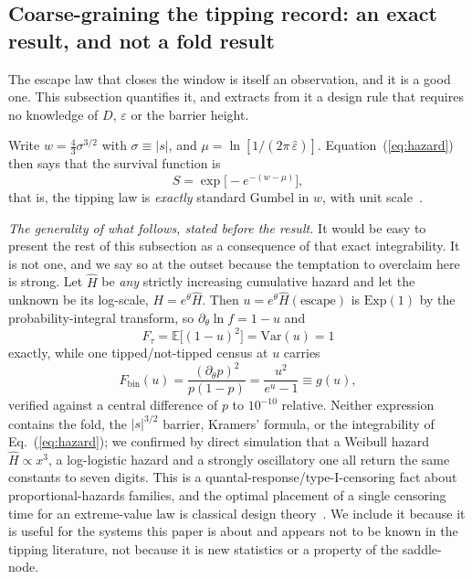 \documentclass[%
 twocolumn,
 superscriptaddress,
 amsmath,amssymb,
 aps,
 pre,
 floatfix,
]{revtex4-2}
\newcommand{\Sig}{\hat\varepsilon}
\begin{document}
\subsection{\label{sec:census}Coarse-graining the tipping record: an exact result, and not a fold result}

The escape law that closes the window is itself an observation, and it is a good one.  This subsection quantifies it, and extracts from it a design rule that requires no knowledge of $D$, $\varepsilon$ or the barrier height.

Write $w=\tfrac43\sigma^{3/2}$ with $\sigma\equiv|s|$, and $\mu=\ln[1/(2\pi\,\Sig)]$.  Equation~(\ref{eq:hazard}) then says that the survival function is
\begin{equation}
\label{eq:gumbel}
S=\exp\bigl[-e^{-(w-\mu)}\bigr],
\end{equation}
that is, the tipping law is \emph{exactly} standard Gumbel in $w$, with unit scale~\cite{Gumbel1958}.

\emph{The generality of what follows, stated before the result.}  It would be easy to present the rest of this subsection as a consequence of that exact integrability.  It is not one, and we say so at the outset because the temptation to overclaim here is strong.  Let $\hat H$ be \emph{any} strictly increasing cumulative hazard and let the unknown be its log-scale, $H=e^{\theta}\hat H$.  Then $u=e^{\theta}\hat H(\text{escape})$ is $\mathrm{Exp}(1)$ by the probability-integral transform, so $\partial_\theta\ln f=1-u$ and
\begin{equation}
\label{eq:ftau}
F_\tau=\mathbb{E}\bigl[(1-u)^2\bigr]=\mathrm{Var}(u)=1
\end{equation}
exactly, while one tipped/not-tipped census at $u$ carries
\begin{equation}
\label{eq:fbin}
F_{\mathrm{bin}}(u)=\frac{(\partial_\theta p)^2}{p(1-p)}=\frac{u^2}{e^{u}-1}\equiv g(u),
\end{equation}
verified against a central difference of $p$ to $10^{-10}$ relative.  Neither expression contains the fold, the $|s|^{3/2}$ barrier, Kramers' formula, or the integrability of Eq.~(\ref{eq:hazard}); we confirmed by direct simulation that a Weibull hazard $\hat H\propto x^3$, a log-logistic hazard and a strongly oscillatory one all return the same constants to seven digits.  This is a quantal-response/type-I-censoring fact about proportional-hazards families, and the optimal placement of a single censoring time for an extreme-value law is classical design theory~\cite{Gertsbakh1995,LehmannCasella1998}.  We include it because it is useful for the systems this paper is about and appears not to be known in the tipping literature, not because it is new statistics or a property of the saddle-node.
\end{document}
